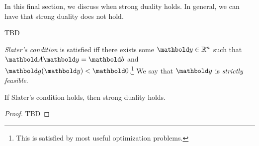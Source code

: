 In this final section, we discuss when strong duality holds. In general, we can have that strong duality does not hold. \begin{ex} TBD
\end{ex}

\begin{defn} \emph{Slater's condition} is satisfied iff there exists some $\vy \in \R^n$ such that $\mA\vy = \vb$ and $\vg(\vy) < \vZero$.\footnote{This is satisfied by most useful optimization problems.} We say that $\vy$ is \emph{strictly feasible}.
\end{defn}

\begin{thm}
If Slater's condition holds, then strong duality holds.
\end{thm}
\begin{proof}
TBD
\end{proof}

